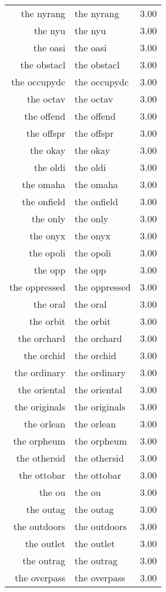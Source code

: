 \begin{table}[ht]
\begin{tabular}{rlr}
  the nyrang & the nyrang & 3.00 \\ 
  the nyu & the nyu & 3.00 \\ 
  the oasi & the oasi & 3.00 \\ 
  the obstacl & the obstacl & 3.00 \\ 
  the occupydc & the occupydc & 3.00 \\ 
  the octav & the octav & 3.00 \\ 
  the offend & the offend & 3.00 \\ 
  the offspr & the offspr & 3.00 \\ 
  the okay & the okay & 3.00 \\ 
  the oldi & the oldi & 3.00 \\ 
  the omaha & the omaha & 3.00 \\ 
  the onfield & the onfield & 3.00 \\ 
  the only & the only & 3.00 \\ 
  the onyx & the onyx & 3.00 \\ 
  the opoli & the opoli & 3.00 \\ 
  the opp & the opp & 3.00 \\ 
  the oppressed & the oppressed & 3.00 \\ 
  the oral & the oral & 3.00 \\ 
  the orbit & the orbit & 3.00 \\ 
  the orchard & the orchard & 3.00 \\ 
  the orchid & the orchid & 3.00 \\ 
  the ordinary & the ordinary & 3.00 \\ 
  the oriental & the oriental & 3.00 \\ 
  the originals & the originals & 3.00 \\ 
  the orlean & the orlean & 3.00 \\ 
  the orpheum & the orpheum & 3.00 \\ 
  the othersid & the othersid & 3.00 \\ 
  the ottobar & the ottobar & 3.00 \\ 
  the ou & the ou & 3.00 \\ 
  the outag & the outag & 3.00 \\ 
  the outdoors & the outdoors & 3.00 \\ 
  the outlet & the outlet & 3.00 \\ 
  the outrag & the outrag & 3.00 \\ 
  the overpass & the overpass & 3.00 \\ 

\end{tabular}
\end{table}
